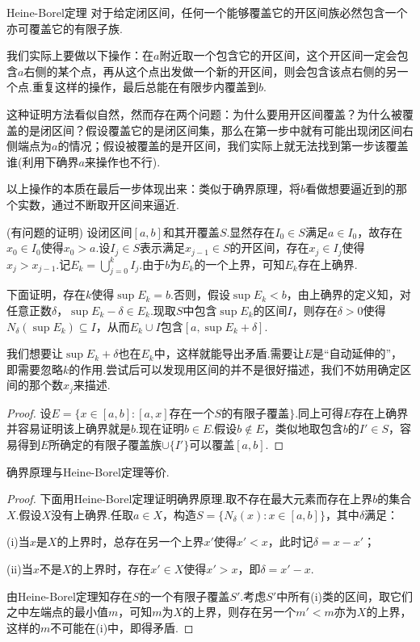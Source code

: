 \begin{theorem}{Heine-Borel定理}
	对于给定闭区间，任何一个能够覆盖它的开区间族必然包含一个亦可覆盖它的有限子族.
\end{theorem}
\begin{hint}
	我们实际上要做以下操作：在$a$附近取一个包含它的开区间，这个开区间一定会包含$a$右侧的某个点，再从这个点出发做一个新的开区间，则会包含该点右侧的另一个点.重复这样的操作，最后总能在有限步内覆盖到$b$.
	
	这种证明方法看似自然，然而存在两个问题：为什么要用开区间覆盖？为什么被覆盖的是闭区间？假设覆盖它的是闭区间集，那么在第一步中就有可能出现闭区间右侧端点为$a$的情况；假设被覆盖的是开区间，我们实际上就无法找到第一步该覆盖谁(利用下确界$a$来操作也不行).
	
	以上操作的本质在最后一步体现出来：类似于确界原理，将$b$看做想要逼近到的那个实数，通过不断取开区间来逼近.
\end{hint}
\begin{hint}
	(有问题的证明)
	设闭区间$[a,b]$和其开覆盖$S$.显然存在$I_0 \in S$满足$a \in I_0$，故存在$x_0 \in I_0$使得$x_0>a$.设$I_j \in S$表示满足$x_{j-1} \in S$的开区间，存在$x_j \in I_j$使得$x_j>x_{j-1}$.记$E_k=\bigcup_{j=0}^{k} I_j$.由于$b$为$E_k$的一个上界，可知$E_k$存在上确界.
	
	下面证明，存在$k$使得$\sup E_k=b$.否则，假设$\sup E_k<b$，由上确界的定义知，对任意正数$\delta$，$\sup E_k - \delta \in E_k$.现取$S$中包含$\sup E_k$的区间$I$，则存在$\delta >0$使得$N_{\delta}(\sup E_k) \subseteq I$，从而$E_k \cup I$包含$[a,\sup E_k+\delta]$.
	
	我们想要让$\sup E_k + \delta$也在$E_k$中，这样就能导出矛盾.需要让$E$是“自动延伸的”，即需要忽略$k$的作用.尝试后可以发现用区间的并不是很好描述，我们不妨用确定区间的那个数$x_j$来描述.
\end{hint}
\begin{proof}
	设$E=\{ x \in [a,b]:[a,x]\text{存在一个$S$的有限子覆盖} \}$.同上可得$E$存在上确界并容易证明该上确界就是$b$.现在证明$b \in E$.假设$b \notin E$，类似地取包含$b$的$I' \in S$，容易得到$E$所确定的有限子覆盖族$\cup \{ I' \}$可以覆盖$[a,b]$.
\end{proof}

\begin{proposition}
	确界原理与Heine-Borel定理等价.
\end{proposition}
\begin{proof}
	下面用Heine-Borel定理证明确界原理.取不存在最大元素而存在上界$b$的集合$X$.假设$X$没有上确界.任取$a \in X$，构造$S=\{ N_{\delta}(x):x \in [a,b] \}$，其中$\delta$满足：
	
	(i)当$x$是$X$的上界时，总存在另一个上界$x'$使得$x'<x$，此时记$\delta =x-x'$；
	
	(ii)当$x$不是$X$的上界时，存在$x' \in X$使得$x'>x$，即$\delta = x'-x$.
	
	由Heine-Borel定理知存在$S$的一个有限子覆盖$S'$.考虑$S'$中所有(i)类的区间，取它们之中左端点的最小值$m$，可知$m$为$X$的上界，则存在另一个$m'<m$亦为$X$的上界，这样的$m$不可能在(i)中，即得矛盾.
\end{proof}

